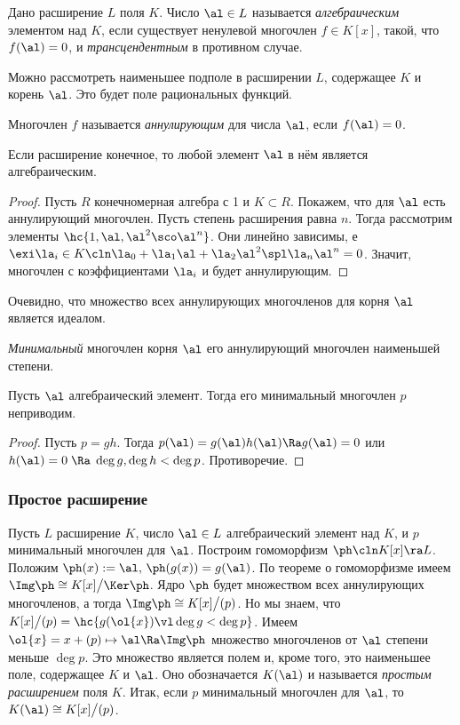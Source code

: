 \documentclass[a4paper]{article}
\begin{document}
\begin{df}
Дано расширение $L$ поля $K$. Число $\al \in L$ называется \emph{алгебраическим} элементом над $K$,
если существует ненулевой многочлен $f \in K[x]$, такой, что $f(\al)=0$, и \emph{трансцендентным} в
противном случае.
\end{df}

Можно рассмотреть наименьшее подполе в расширении $L$, содержащее $K$ и корень $\al$. Это будет поле
рациональных функций.

\begin{df}
Многочлен $f$ называется \emph{аннулирующим} для числа $\al$, если $f(\al)=0$.
\end{df}

\begin{theorem}
\label{FiniteExtensionTheorem}Если расширение конечное, то любой элемент $\al$ в нём является алгебраическим.
\end{theorem}
\begin{proof}
Пусть $R$ конечномерная алгебра с 1 и $K \subset R$. Покажем, что для $\al$ есть аннулирующий
многочлен. Пусть степень расширения равна $n$. Тогда рассмотрим элементы $\hc{1, \al, \al^2 \sco
\al^n}$. Они линейно зависимы, е $\exi \la_i \in K\cln \la_0 + \la_1\al + \la_2
\al^2 \spl \la_n \al^n=0$. Значит, многочлен с коэффициентами $\la_i$ и будет аннулирующим.
\end{proof}

Очевидно, что множество всех аннулирующих многочленов для корня $\al$ является идеалом.

\begin{df}
\emph{Минимальный} многочлен корня $\al$ его аннулирующий многочлен наименьшей степени.
\end{df}

\begin{stm}
Пусть $\al$ алгебраический элемент. Тогда его минимальный многочлен $p$ неприводим.
\end{stm}
\begin{proof}
Пусть $p=gh$. Тогда $p(\al)=g(\al)h(\al) \Ra g(\al)=0$ или $h(\al)=0 \; \Ra \; \deg g, \deg h < \deg p$. Противоречие.
\end{proof}

\subsubsection{Простое расширение}

Пусть $L$ расширение $K$, число $\al \in L$ алгебраический элемент над $K$, и $p$ минимальный
многочлен для $\al$. Построим гомоморфизм $\ph\cln K[x] \ra L$. Положим $\ph(x) := \al, \,
\ph(g(x))=g(\al)$. По теореме о гомоморфизме имеем $\Img \ph \cong K[x]\bigl/\Ker \ph$. Ядро $\ph$ будет
множеством всех аннулирующих многочленов, а тогда $\Img \ph \cong K[x]\bigl/(p)$. Но мы знаем, что
$K[x]\bigl/(p) = \hc{g(\ol{x}) \vl \deg g <  \deg p}$. Имеем $\ol{x} = x + (p) \mapsto \al \Ra \Img
\ph$ множество многочленов от $\al$ степени меньше $\deg p$. Это множество является полем и, кроме
того, это наименьшее поле, содержащее $K$ и $\al$. Оно обозначается $K(\al)$ и называется
\emph{\emph{простым расширением}} поля $K$. Итак, если $p$ минимальный многочлен для $\al$, то
$K(\al) \cong K[x]\bigl/(p)$.
\end{document}
